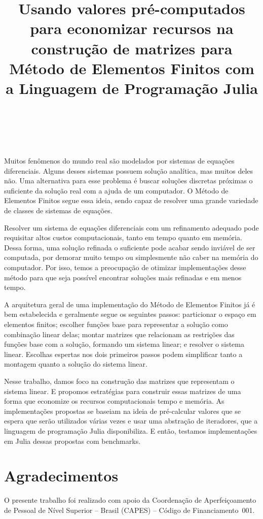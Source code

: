 \documentclass{pssbmac}
\title{Usando valores pré-computados
    para economizar recursos
    na construção de matrizes
    para Método de Elementos Finitos
    com a Linguagem de Programação Julia
}
\author{
    \templauthoremail{Daniel K. Hashimoto V. de Andrade}{dkhashimoto@ic.ufrj.br} \\
    \templlocation{UFRJ, Rio de Janeiro, RJ} \\
}
\begin{document}
\criartitulo

Muitos fenômenos do mundo real
são modelados por sistemas de equações diferenciais.
Alguns desses sistemas possuem solução analítica,
mas muitos deles não.
Uma alternativa para esse problema
é buscar soluções discretas
próximas o suficiente da solução real
com a ajuda de um computador.
O Método de Elementos Finitos
segue essa ideia,
sendo capaz de resolver
uma grande variedade de classes de sistemas de equações.

Resolver um sistema de equações diferenciais
com um refinamento adequado
pode requisitar altos custos computacionais,
tanto em tempo quanto em memória.
Dessa forma,
uma solução refinada o suficiente
pode acabar sendo inviável de ser computada,
por demorar muito tempo ou
simplesmente não caber na memória do computador.
Por isso,
temos a preocupação de otimizar implementações
desse método para que
seja possível encontrar soluções
mais refinadas e em menos tempo.

A arquitetura geral de uma implementação
do Método de Elementos Finitos
já é bem estabelecida
e geralmente segue os seguintes passos:
particionar o espaço em elementos finitos;
escolher funções base para representar
a solução como combinação linear delas;
montar matrizes que relacionam
as restrições das funções base com a solução,
formando um sistema linear;
e resolver o sistema linear.
Escolhas espertas nos dois primeiros passos
podem simplificar
tanto a montagem quanto a solução do sistema linear.

Nesse trabalho,
damos foco na construção das matrizes
que representam o sistema linear.
E propomos estratégias
para construir essas matrizes
de uma forma que economize
os recursos computacionais tempo e memória.
As implementações propostas
se baseiam na ideia de pré-calcular
valores que se espera que serão utilizados várias vezes
e usar uma abstração de iteradores,
que a linguagem de programação Julia
disponibiliza.
E então,
testamos implementações em Julia
dessas propostas com benchmarks.

%     

\section*{Agradecimentos}

O presente trabalho foi realizado com apoio da
Coordenação de Aperfeiçoamento de Pessoal de Nível Superior
-- Brasil (CAPES) --
Código de Financiamento~001.


\printbibliography
\end{document}
